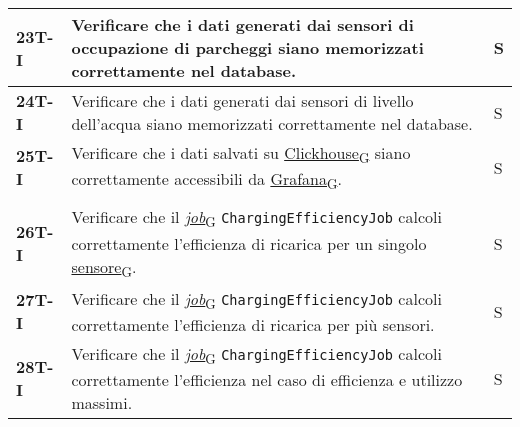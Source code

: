 \begin{longtable}{|>{\raggedright\arraybackslash}m{}|>{\raggedright\arraybackslash}m{}|>{\raggedright\arraybackslash}m{}|}
	\hline
	\textbf{23T-I}  & Verificare che i dati generati dai sensori di occupazione di parcheggi siano memorizzati correttamente nel database.                                                                                                                                                                                                                & S              \\
	\hline
	\textbf{24T-I}  & Verificare che i dati generati dai sensori di livello dell'acqua siano memorizzati correttamente nel database.                                                                                                                                                                                                                      & S              \\
	\hline
	\textbf{25T-I}  & Verificare che i dati salvati su \href{https://7last.github.io/docs/rtb/documentazione-interna/glossario\#clickhouse}{Clickhouse\textsubscript{G}} siano correttamente accessibili da \href{https://7last.github.io/docs/rtb/documentazione-interna/glossario\#grafana}{Grafana\textsubscript{G}}.                                  & S              \\
	\hline
	\multicolumn{3}{|c|}{\textbf{Apache Flink}} \\
	\hline
	\textbf{26T-I}  & Verificare che il \href{https://7last.github.io/docs/pb/documentazione-interna/glossario\#job}{\textit{job}\textsubscript{G}} \texttt{ChargingEfficiencyJob} calcoli correttamente l'efficienza di ricarica per un singolo \href{https://7last.github.io/docs/pb/documentazione-interna/glossario\#sensore}{sensore\textsubscript{G}}.                                                                                                                                                                                                & S              \\
	\hline
	\textbf{27T-I}  & Verificare che il \href{https://7last.github.io/docs/pb/documentazione-interna/glossario\#job}{\textit{job}\textsubscript{G}} \texttt{ChargingEfficiencyJob} calcoli correttamente l'efficienza di ricarica per più sensori.                                                                                                                                                                                                       & S              \\
	\hline
	\textbf{28T-I}  & Verificare che il \href{https://7last.github.io/docs/pb/documentazione-interna/glossario\#job}{\textit{job}\textsubscript{G}} \texttt{ChargingEfficiencyJob} calcoli correttamente l'efficienza nel caso di efficienza e utilizzo massimi.                                                                                                                                                                                         & S              \\

\end{longtable}
